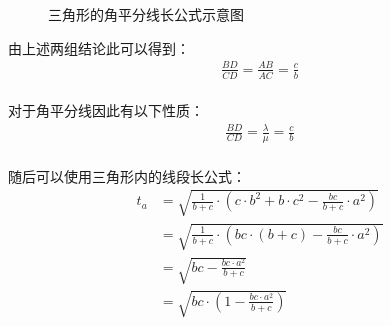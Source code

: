 \documentclass[UTF8]{ctexart}
\begin{document}
    \begin{figure}[h!]
        \begin{center}
            \caption{三角形的角平分线长公式示意图}
        \end{center}
    \end{figure}

\newpage

    由上述两组结论此可以得到：
    \begin{align}
        \frac{BD}{CD}=\frac{AB}{AC}=\frac{c}{b}
    \end{align}\\
    对于角平分线因此有以下性质：
    \begin{align}
        \frac{BD}{CD}=\frac{\lambda}{\mu}=\frac{c}{b}
    \end{align}\\
    随后可以使用三角形内的线段长公式：\vspace{8pt}
    \begin{align}
        t_a
        &=\sqrt{\frac{1}{b+c}\cdot\left(c\cdot b^2+b\cdot c^2-\frac{bc}{b+c}\cdot a^2\right)}\\[3mm]
        &=\sqrt{\frac{1}{b+c}\cdot\left(bc\cdot(b+c)-\frac{bc}{b+c}\cdot a^2\right)}\\[3mm]
        &=\sqrt{bc-\frac{bc\cdot a^2}{b+c}}\\[3mm]
        &=\sqrt{bc\cdot\left(1-\frac{bc\cdot a^2}{b+c}\right)}
    \end{align}
\end{document}
